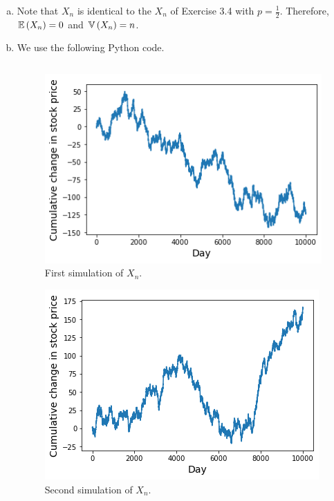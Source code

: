 \begin{ex}
  \begin{enumerate}[(a)]
    \item Note that $X_n$ is identical to the $X_n$ of Exercise 3.4 with
          $p=\frac{1}{2}$. Therefore, $\mathbb{E}\left(X_n\right)=0$ and $\mathbb{V}\left(X_n\right)=n$.
    \item We use the following Python code.
          \inputminted{python}{src/03-11.py}

          \begin{figure}[H]
            \centering
            \includegraphics[scale=0.8]{part1/ch03-11a}
            \caption{First simulation of $X_n$.}
          \end{figure}

          \begin{figure}[H]
            \centering
            \includegraphics[scale=0.8]{part1/ch03-11b}
            \caption{Second simulation of $X_n$.}
          \end{figure}


\end{enumerate}
\end{ex}
